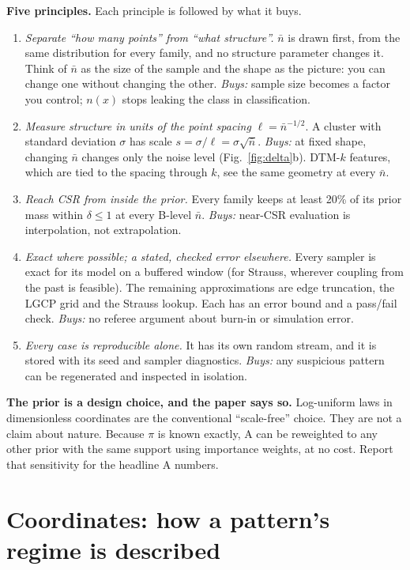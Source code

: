 \documentclass[10pt,a4paper]{article}
\newcommand{\nbar}{\bar n}
\begin{document}
\textbf{Five principles.} Each principle is followed by what it buys.
\begin{enumerate}
  \item[P1] \emph{Separate ``how many points'' from ``what structure''.} $\nbar$ is drawn first, from the same distribution for every family, and no structure parameter changes it. Think of $\nbar$ as the size of the sample and the shape as the picture: you can change one without changing the other. \emph{Buys:} sample size becomes a factor you control; $n(x)$ stops leaking the class in classification.
  \item[P2] \emph{Measure structure in units of the point spacing} $\ell=\nbar^{-1/2}$. A cluster with standard deviation $\sigma$ has scale $s=\sigma/\ell=\sigma\sqrt{\nbar}$. \emph{Buys:} at fixed shape, changing $\nbar$ changes only the noise level (Fig.~\ref{fig:delta}b). DTM-$k$ features, which are tied to the spacing through $k$, see the same geometry at every $\nbar$.
  \item[P3] \emph{Reach CSR from inside the prior.} Every family keeps at least 20\% of its prior mass within $\delta\le1$ at every B-level $\nbar$. \emph{Buys:} near-CSR evaluation is interpolation, not extrapolation.
  \item[P4] \emph{Exact where possible; a stated, checked error elsewhere.} Every sampler is exact for its model on a buffered window (for Strauss, wherever coupling from the past is feasible). The remaining approximations are edge truncation, the LGCP grid and the Strauss lookup. Each has an error bound and a pass/fail check. \emph{Buys:} no referee argument about burn-in or simulation error.
  \item[P5] \emph{Every case is reproducible alone.} It has its own random stream, and it is stored with its seed and sampler diagnostics. \emph{Buys:} any suspicious pattern can be regenerated and inspected in isolation.
\end{enumerate}

\textbf{The prior is a design choice, and the paper says so.} Log-uniform laws in dimensionless coordinates are the conventional ``scale-free'' choice. They are not a claim about nature. Because $\pi$ is known exactly, A can be reweighted to any other prior with the same support using importance weights, at no cost. Report that sensitivity for the headline A numbers.

\section{Coordinates: how a pattern's regime is described}\label{sec:coords}
\end{document}
